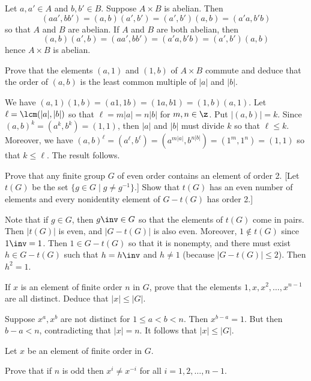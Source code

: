 \begin{problems}
\begin{sol}
        Let $a, a' \in A$ and $b, b' \in B$. Suppose $A \times B$ is abelian. Then
        \[(aa', bb') = (a, b)(a', b') = (a', b')(a, b) = (a'a, b'b)\]
        so that $A$ and $B$ are abelian. If $A$ and $B$ are both abelian, then
        \[(a, b)(a', b) = (aa', bb') = (a'a, b'b) = (a', b')(a, b)\]
        hence $A \times B$ is abelian.
    \end{sol}
    \item Prove that the elements $(a, 1)$ and $(1, b)$ of $A \times B$ commute and deduce that the order of $(a, b)$ is the least common multiple of $|a|$ and $|b|$.
    \begin{sol}
        We have $(a, 1)(1, b) = (a1, 1b) = (1a, b1) = (1, b)(a, 1)$. Let $\ell = \lcm(|a|, |b|)$ so that $\ell = m|a| = n|b|$ for $m, n \in \z$. Put $|(a, b)| = k$. Since $(a, b)^k = (a^k, b^k) = (1, 1)$, then $|a|$ and $|b|$ must divide $k$ so that $\ell \leq k$. Moreover, we have $(a, b)^\ell = (a^\ell, b^\ell) = (a^{m|a|}, b^{n|b|}) = (1^m, 1^n) = (1, 1)$ so that $k \leq \ell$. The result follows.
    \end{sol}
    \item Prove that any finite group $G$ of even order contains an element of order 2. [Let $t(G)$ be the set $\{g \in G \mid g \neq g^{-1}\}$.] Show that $t(G)$ has an even number of elements and every nonidentity element of $G - t(G)$ has order 2.]
    \begin{sol}
        Note that if $g \in G$, then $g\inv \in G$ so that the elements of $t(G)$ come in pairs. Then $|t(G)|$ is even, and $|G-t(G)|$ is also even. Moreover, $1 \not\in t(G)$ since $1\inv = 1$. Then $1 \in G - t(G)$ so that it is nonempty, and there must exist $h \in G - t(G)$ such that $h = h\inv$ and $h \neq 1$ (because $|G - t(G)| \leq 2$). Then $h^2 = 1$.
    \end{sol}
    \item If $x$ is an element of finite order $n$ in $G$, prove that the elements $1, x, x^2, \dots, x^{n-1}$ are all distinct. Deduce that $|x| \leq |G|$.
    \begin{sol}
        Suppose $x^a, x^b$ are not distinct for $1 \leq a < b < n$. Then $x^{b - a} = 1$. But then $b - a < n$, contradicting that $|x| = n$. It follows that $|x| \leq |G|$.
    \end{sol}    
    \item \label{ex1.1.33} Let $x$ be an element of finite order in $G$.
    \begin{problems}
        \item Prove that if $n$ is odd then $x^i \neq x^{-i}$ for all $i = 1, 2, \dots, n-1$.

\end{problems}
\end{problems}
